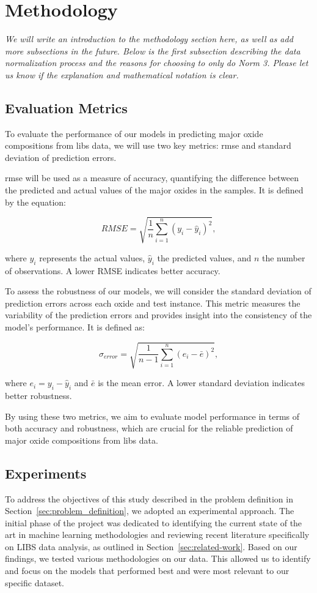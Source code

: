 \section{Methodology}\label{sec:methodology}
\textit{We will write an introduction to the methodology section here, as well as add more subsections in the future. Below is the first subsection describing the data normalization process and the reasons for choosing to only do Norm 3. Please let us know if the explanation and mathematical notation is clear.}

\subsection{Evaluation Metrics}
To evaluate the performance of our models in predicting major oxide compositions from \gls{libs} data, we will use two key metrics: \gls{rmse} and standard deviation of prediction errors.

\gls{rmse} will be used as a measure of accuracy, quantifying the difference between the predicted and actual values of the major oxides in the samples. It is defined by the equation:

\begin{equation}
    RMSE = \sqrt{\frac{1}{n} \sum_{i=1}^{n} (y_i - \hat{y}_i)^2},
\end{equation}

where $y_i$ represents the actual values, $\hat{y}_i$ the predicted values, and $n$ the number of observations. A lower RMSE indicates better accuracy.

To assess the robustness of our models, we will consider the standard deviation of prediction errors across each oxide and test instance. This metric measures the variability of the prediction errors and provides insight into the consistency of the model's performance. It is defined as:

\begin{equation}
    \sigma_{error} = \sqrt{\frac{1}{n-1} \sum_{i=1}^{n} (e_i - \bar{e})^2},
\end{equation}

where $e_i = y_i - \hat{y}_i$ and $\bar{e}$ is the mean error. A lower standard deviation indicates better robustness.

By using these two metrics, we aim to evaluate model performance in terms of both accuracy and robustness, which are crucial for the reliable prediction of major oxide compositions from \gls{libs} data.

\subsection{Experiments}
To address the objectives of this study described in the problem definition in Section~\ref{sec:problem_definition}, we adopted an experimental approach.
The initial phase of the project was dedicated to identifying the current state of the art in machine learning methodologies and reviewing recent literature specifically on LIBS data analysis, as outlined in Section~\ref{sec:related-work}.
Based on our findings, we tested various methodologies on our data.
This allowed us to identify and focus on the models that performed best and were most relevant to our specific dataset.

